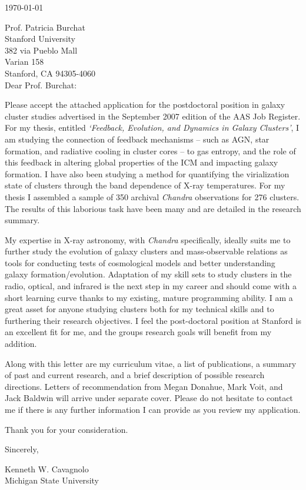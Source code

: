 \documentclass[11pt]{article}
\begin{document}
\today

Prof. Patricia Burchat\\
Stanford University\\
382 via Pueblo Mall\\
Varian 158\\
Stanford, CA 94305-4060\\

Dear Prof. Burchat:

Please accept the attached application for the postdoctoral
position in galaxy cluster studies advertised in the September 2007 edition
of the AAS Job Register. For my thesis, entitled {\textit{`Feedback,
Evolution, and Dynamics in Galaxy Clusters'}}, I am studying
the connection of feedback mechanisms -- such as AGN, star formation, and
radiative cooling in cluster cores -- to gas entropy, and the role
of this feedback in altering global properties of the ICM and 
impacting galaxy formation. I have also been studying a method for
quantifying the virialization state of clusters through the band
dependence of X-ray temperatures. For my thesis I assembled a sample
of 350 archival {\textit{Chandra}} observations for 276 clusters. The
results of this laborious task have been many and are detailed in the
research summary.

My expertise in X-ray astronomy, with {\textit{Chandra}}
specifically, ideally suits me to further study the evolution of
galaxy clusters and mass-observable relations as tools for
conducting tests of cosmological models and better understanding galaxy
formation/evolution. Adaptation of my skill sets to study clusters
in the radio, optical, and infrared is the next step in my
career and should come with a short learning curve thanks to my
existing, mature programming ability. I am a great asset for anyone
studying clusters both for my technical skills and to furthering
their research objectives. I feel the post-doctoral position at
Stanford is an excellent fit for me, and the groups research goals will
benefit from my addition.

Along with this letter are my curriculum vitae, a list of
publications, a summary of past and current research, and a brief
description of possible research directions. Letters of recommendation
from Megan Donahue, Mark Voit, and Jack Baldwin will arrive under
separate cover. Please do not hesitate to contact me if there is any
further information I can provide as you review my application.

Thank you for your consideration.

Sincerely,\\
\begin{minipage}{7.5in}
\end{minipage}
Kenneth W. Cavagnolo\\
Michigan State University
\end{document}
